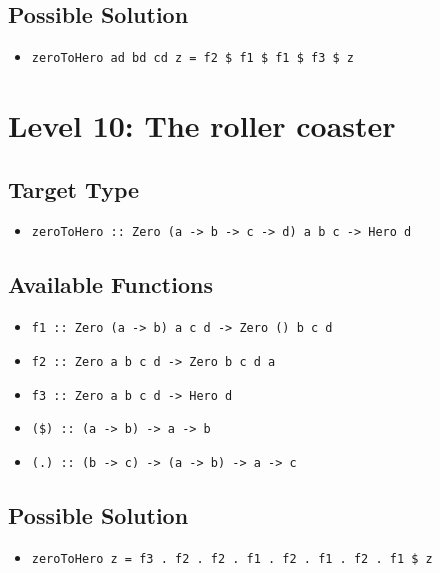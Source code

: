 \subsection*{Possible Solution} 
\begin{itemize}
    \item \texttt{zeroToHero ad bd cd z = f2 \$ f1 \$ f1 \$ f3 \$ z}
\end{itemize}


\section{Level 10: The roller coaster}
\subsection*{Target Type } 
\begin{itemize}
    \item \texttt{zeroToHero :: Zero (a -> b -> c -> d) a b c  -> Hero d}
\end{itemize}

\subsection*{Available Functions} 
\begin{itemize}
    \item \texttt{f1 :: Zero (a -> b) a c d -> Zero () b c d}
    \item \texttt{f2 :: Zero a b c d -> Zero b c d a}
    \item \texttt{f3 :: Zero a b c d -> Hero d}
    \item \texttt{(\$) :: (a -> b) -> a -> b}
    \item \texttt{(.) :: (b -> c) -> (a -> b) -> a -> c}
\end{itemize}

\subsection*{Possible Solution} 
\begin{itemize}
    \item \texttt{zeroToHero z = f3 . f2 . f2 . f1 . f2 . f1 . f2 . f1 \$ z}
\end{itemize}